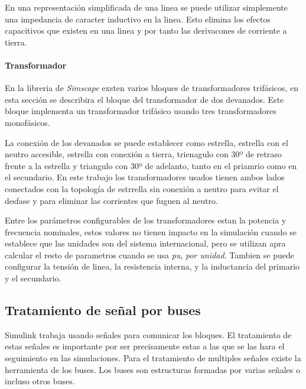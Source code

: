 \documentclass{book}
\begin{document}
En una representaci\'on simplificada de una linea se puede utilizar simplemente una impedancia de caracter inductivo en la linea. Esto elimina los efectos capacitivos que existen en una linea y por tanto las derivacones de corriente a tierra. \par 

		\paragraph{Transformador}

En la libreria de \emph{Simscape} exsten varios bloques de transformadores trif\'asicos, en esta secci\'on se describira el bloque del transformador de dos devanados. Este bloque implementa un transformador trif\'asico usando tres transformadores monof\'asicos. \par

La conexi\'on de los devanados se puede establecer como estrella, estrella con el neutro accesible, estrella con conexi\'on a tierra, trienagulo con 30º de retraso frente a la estrella y triangulo con 30º de adelanto,  tanto en el priamrio como en el secundario. En este trabajo los transformadores usados tienen ambos lados conectados con la topolog\'ia de estrrella sin conexi\'on a neutro para evitar el desfase y para eliminar las corrientes que fuguen al neutro. \par

Entre los par\'ametros configurables de los transformadores estan la potencia y frecuencia nominales, estos valores no tienen impacto en la simulaci\'on cuando se establece que las unidades son del sistema internacional, pero se utilizan apra calcular el resto de parametros cuando se usa \emph{pu}, \emph{por unidad}. Tambien se puede configurar la tensi\'on de linea, la resistencia interna, y la inductancia del primario y el secundario. \par

		\subsection{Tratamiento de señal por buses}

Simulink trabaja usando señales para comunicar los bloques. El tratamiento de estas señales es importante por ser precisamente estas a las que se las hara el seguimiento en las simulaciones. Para el tratamiento de multiples señales existe la herramienta de los buses. Los buses son estructuras formadas por varias señales o incluso otros buses. \par
\end{document}
